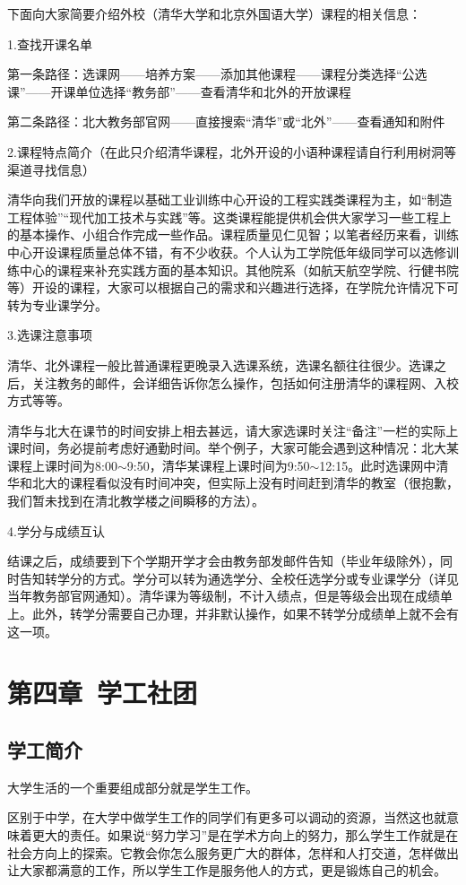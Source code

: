 \documentclass[11pt,oneside]{book}
\begin{document}
下面向大家简要介绍外校（清华大学和北京外国语大学）课程的相关信息：

1.查找开课名单

第一条路径：选课网——培养方案——添加其他课程——课程分类选择“公选课”——开课单位选择“教务部”——查看清华和北外的开放课程

第二条路径：北大教务部官网——直接搜索“清华”或“北外”——查看通知和附件

2.课程特点简介（在此只介绍清华课程，北外开设的小语种课程请自行利用树洞等渠道寻找信息）

清华向我们开放的课程以基础工业训练中心开设的工程实践类课程为主，如“制造工程体验”“现代加工技术与实践”等。这类课程能提供机会供大家学习一些工程上的基本操作、小组合作完成一些作品。课程质量见仁见智；以笔者经历来看，训练中心开设课程质量总体不错，有不少收获。个人认为工学院低年级同学可以选修训练中心的课程来补充实践方面的基本知识。其他院系（如航天航空学院、行健书院等）开设的课程，大家可以根据自己的需求和兴趣进行选择，在学院允许情况下可转为专业课学分。

 3.选课注意事项

清华、北外课程一般比普通课程更晚录入选课系统，选课名额往往很少。选课之后，关注教务的邮件，会详细告诉你怎么操作，包括如何注册清华的课程网、入校方式等等。

清华与北大在课节的时间安排上相去甚远，请大家选课时关注“备注”一栏的实际上课时间，务必提前考虑好通勤时间。举个例子，大家可能会遇到这种情况：北大某课程上课时间为8:00$\sim$9:50，清华某课程上课时间为9:50$\sim$12:15。此时选课网中清华和北大的课程看似没有时间冲突，但实际上没有时间赶到清华的教室（很抱歉，我们暂未找到在清北教学楼之间瞬移的方法）。

 4.学分与成绩互认

结课之后，成绩要到下个学期开学才会由教务部发邮件告知（毕业年级除外），同时告知转学分的方式。学分可以转为通选学分、全校任选学分或专业课学分（详见当年教务部官网通知）。清华课为等级制，不计入绩点，但是等级会出现在成绩单上。此外，转学分需要自己办理，并非默认操作，如果不转学分成绩单上就不会有这一项。


\chapter{第四章\ 学工社团}
    \section{学工简介}
大学生活的一个重要组成部分就是学生工作。

区别于中学，在大学中做学生工作的同学们有更多可以调动的资源，当然这也就意味着更大的责任。如果说“努力学习”是在学术方向上的努力，那么学生工作就是在社会方向上的探索。它教会你怎么服务更广大的群体，怎样和人打交道，怎样做出让大家都满意的工作，所以学生工作是服务他人的方式，更是锻炼自己的机会。
\end{document}
